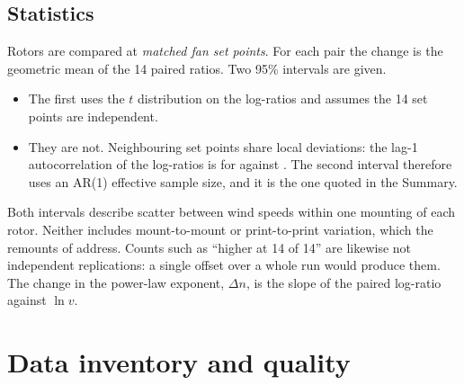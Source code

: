 \documentclass[11pt]{article}
\begin{document}
\subsection{Statistics}\label{sec:stats}
Rotors are compared at \emph{matched fan set points}. For each pair the change is the geometric
mean of the 14 paired ratios. Two 95\% intervals are given.
\begin{itemize}
  \item The first uses the $t$ distribution on the log-ratios and assumes the 14 set points
        are independent.
  \item They are not. Neighbouring set points share local deviations: the lag-1
        autocorrelation of the log-ratios is \roneACraw{} for  against . The
        second interval therefore uses an AR(1) effective sample size, and it is the one
        quoted in the Summary.
\end{itemize}
Both intervals describe scatter between wind speeds within one mounting of each rotor. Neither
includes mount-to-mount or print-to-print variation\ifHaveRepeat, which the remounts of
 address\fi. Counts such as ``higher at 14 of 14'' are likewise not
independent replications: a single offset over a whole run would produce them. The change in
the power-law exponent, $\Delta n$, is the slope of the paired log-ratio against $\ln v$.

\section{Data inventory and quality}\label{sec:quality}
\end{document}
